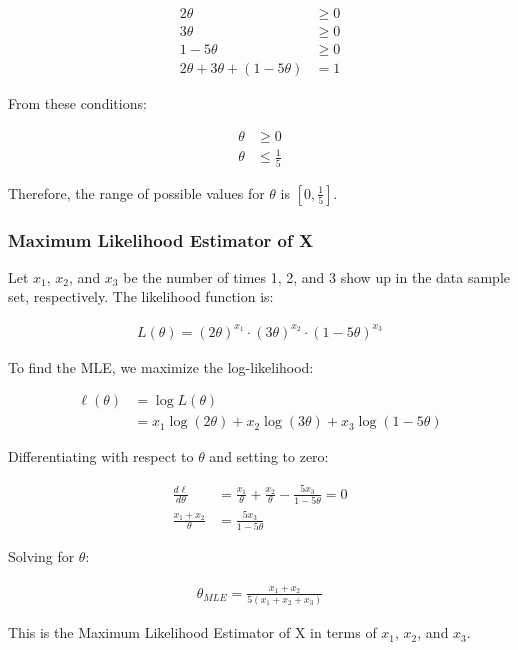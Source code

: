 \documentclass{article}
\begin{document}
\begin{align*}
2\theta &\geq 0 \\
3\theta &\geq 0 \\
1 - 5\theta &\geq 0 \\
2\theta + 3\theta + (1 - 5\theta) &= 1
\end{align*}

From these conditions:

\begin{align*}
\theta &\geq 0 \\
\theta &\leq \frac{1}{5}
\end{align*}

Therefore, the range of possible values for $\theta$ is $[0, \frac{1}{5}]$.

\subsubsection*{Maximum Likelihood Estimator of X}

Let $x_1$, $x_2$, and $x_3$ be the number of times 1, 2, and 3 show up in the data sample set, respectively. The likelihood function is:

\begin{align*}
L(\theta) = (2\theta)^{x_1} \cdot (3\theta)^{x_2} \cdot (1-5\theta)^{x_3}
\end{align*}

To find the MLE, we maximize the log-likelihood:

\begin{align*}
\ell(\theta) &= \log L(\theta) \\
&= x_1 \log(2\theta) + x_2 \log(3\theta) + x_3 \log(1-5\theta)
\end{align*}

Differentiating with respect to $\theta$ and setting to zero:

\begin{align*}
\frac{d\ell}{d\theta} &= \frac{x_1}{\theta} + \frac{x_2}{\theta} - \frac{5x_3}{1-5\theta} = 0 \\
\frac{x_1 + x_2}{\theta} &= \frac{5x_3}{1-5\theta}
\end{align*}

Solving for $\theta$:

\begin{align*}
\hat{\theta}_{MLE} = \frac{x_1 + x_2}{5(x_1 + x_2 + x_3)}
\end{align*}

This is the Maximum Likelihood Estimator of X in terms of $x_1$, $x_2$, and $x_3$.
\end{document}
